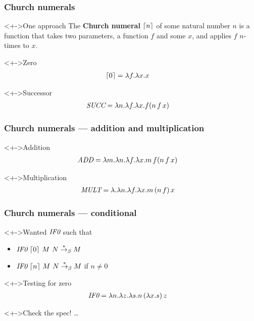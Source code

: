 \documentclass[pdftex,aspectratio=169]{beamer}
\begin{document}
\begin{frame}[fragile]
  \frametitle{Church numerals}
\begin{exampleblock}<+->{One approach}
  The \textbf{Church numeral}
  $\lceil n\rceil$ of some natural number $n$ is a function that takes
  two parameters, a function $f$ and some $x$, and applies $f$ $n$-times to $x$.
\end{exampleblock}
\begin{alertblock}<+->{Zero}\VSPBLS
  \begin{align*}
    \lceil0\rceil & = \lambda f. \lambda x. x
  \end{align*}
\end{alertblock}
\begin{alertblock}<+->{Successor}\VSPBLS
  \begin{align*}
    \textit{SUCC} & = \lambda n. \lambda f. \lambda x. f (n\, f\,x)
  \end{align*}
\end{alertblock}
\end{frame}

\begin{frame}[fragile]
  \frametitle{Church numerals --- addition and multiplication}
\begin{alertblock}<+->{Addition}\VSPBLS
  \begin{align*}
    \textit{ADD} & = \lambda m. \lambda n. \lambda f. \lambda x. m\, f (n\, f\, x)
  \end{align*}
\end{alertblock}
\begin{alertblock}<+->{Multiplication}\VSPBLS
  \begin{align*}
    \textit{MULT} & = \lambda . \lambda n. \lambda f. \lambda x. m\, (n\, f)\, x
  \end{align*}
\end{alertblock}
\end{frame}

\begin{frame}[fragile]
  \frametitle{Church numerals --- conditional}
  \begin{exampleblock}<+->{Wanted}
    $\textit{IF0}$ such that
    \begin{itemize}
    \item $\textit{IF0}~\lceil0\rceil~M~N \stackrel\ast\rightarrow_\beta M$
    \item $\textit{IF0}~\lceil n\rceil~M~N \stackrel\ast\rightarrow_\beta M$ if $n\ne 0$
    \end{itemize}
  \end{exampleblock}
  \begin{alertblock}<+->{Testing for zero}\VSPBLS
    \begin{align*}
      \textit{IF0} &= \lambda n. \lambda z. \lambda s. n\,(\lambda x. s)\,z
    \end{align*}
  \end{alertblock}
  \begin{alertblock}<+->{Check the spec!}
    \dots
  \end{alertblock}
\end{frame}
\end{document}
